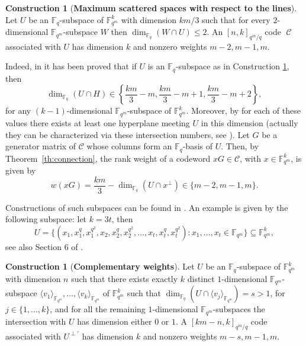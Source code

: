 \documentclass[11pt]{amsart}
\DeclareMathOperator{\C}{\mathcal{C}}
\theoremstyle{definition}
\newtheorem{construction}[theorem]{Construction}
\newcommand{\F}{{\mathbb F}}
\newcommand{\fq}{{\mathbb F}_{q}}
\begin{document}
\begin{construction}[\textbf{Maximum scattered spaces with respect to the lines}]\label{con:maxscatlines}
Let $U$ be an $\fq$-subspace of $\F_{q^m}^k$ with dimension $km/3$ such that for every $2$-dimensional $\F_{q^m}$-subspace $W$ then $\dim_{\fq}(W\cap U)\leq 2$. An $[n,k]_{q^m/q}$ code $\C$ associated with $U$ has dimension $k$ and nonzero weights $m-2,m-1,m$.
\end{construction}

Indeed, in \cite[Theorem 2.7]{csajbok2021generalising} it has been proved that if $U$ is an $\fq$-subspace as in Construction \ref{con:maxscatlines}, then
\[ \dim_{\fq}(U\cap H) \in \left\{ \frac{km}3-m,\frac{km}3-m+1, \frac{km}3-m+2 \right\}, \]
for any $(k-1)$-dimensional $\F_{q^m}$-subspace of $\F_{q^m}^k$.
Moreover, by \cite[Theorem 7.1]{zini2021scattered} for each of these values there exists at least one hyperplane meeting $U$ in this dimension
(actually they can be characterized via these intersection numbers, see \cite[Corollary 5.3]{zini2021scattered}). Let \( G \) be a generator matrix of \( \mathcal{C} \) whose columns form an \( \mathbb{F}_q \)-basis of \( U \). Then, by Theorem~\ref{th:connection}, the rank weight of a codeword \( xG \in \mathcal{C} \), with \( x \in \mathbb{F}_{q^m}^k \), is given by
\[
w(xG) = \frac{km}{3} - \dim_{\mathbb{F}_q}(U \cap x^{\perp}) \in \{m-2, m-1, m\}.
\]

Constructions of such subspaces can be found in \cite{csajbok2021generalising}.
An example is given by the following subspace:
let $k=3t$, then
\[ U=\{ (x_1,x_1^q,x_1^{q^2},x_2,x_2^q,x_2^{q^2},\ldots,x_t,x_t^q,x_t^{q^2}) \colon x_1,\ldots,x_t \in \F_{q^m} \}\subseteq \F_{q^m}^{k}, \]
see also Section 6 of \cite{napolitano2020codes}.

\begin{construction}[\textbf{Complementary weights}] \label{const:complweightsk>3}
Let $U$ be an $\fq$-subspace of $\F_{q^m}^k$ with dimension $n$ such that there exists exactly $k$ distinct $1$-dimensional $\F_{q^m}$-subspace $\langle v_1 \rangle_{\F_{q^m}},\ldots,\langle v_k \rangle_{\F_{q^m}}$ of $\F_{q^m}^k$ such that $\dim_{\fq}(U\cap \langle v_j \rangle_{\F_{q^m}})=s>1$, for $j \in \{1,\ldots,k\}$, and for all the remaining $1$-dimensional $\F_{q^m}$-subspaces the intersection with $U$ has dimension either $0$ or $1$.
A $[km-n,k]_{q^m/q}$ code associated with $U^{\perp'}$ has dimension $k$ and nonzero weights $m-s,m-1,m$.
\end{construction}
\end{document}
